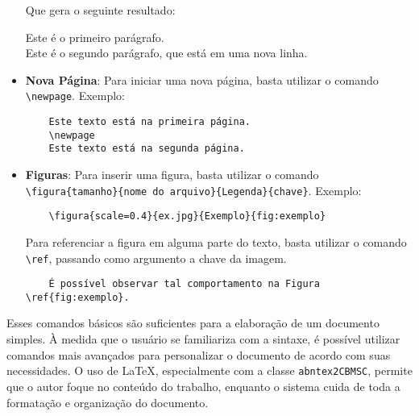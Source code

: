 \begin{itemize}
    Que gera o seguinte resultado:

    Este é o primeiro parágrafo.\\
    Este é o segundo parágrafo, que está em uma nova linha.
    
    \item \textbf{Nova Página}: Para iniciar uma nova página, basta utilizar o comando \texttt{\textbackslash newpage}. Exemplo:
    \begin{verbatim}
    Este texto está na primeira página.
    \newpage
    Este texto está na segunda página.
    \end{verbatim}

    \item \textbf{Figuras}: Para inserir uma figura, basta utilizar o comando \texttt{\textbackslash figura\{tamanho\}\{nome do arquivo\}\{Legenda\}\{chave\}}. Exemplo:
    \begin{verbatim}
    \figura{scale=0.4}{ex.jpg}{Exemplo}{fig:exemplo}
    \end{verbatim}

    Para referenciar a figura em alguma parte do texto, basta utilizar o comando \texttt{\textbackslash ref}, passando como argumento a chave da imagem.

    \begin{verbatim}
    É possível observar tal comportamento na Figura \ref{fig:exemplo}.
    \end{verbatim}
\end{itemize}

Esses comandos básicos são suficientes para a elaboração de um documento simples. À medida que o usuário se familiariza com a sintaxe, é possível utilizar comandos mais avançados para personalizar o documento de acordo com suas necessidades. O uso de LaTeX, especialmente com a classe \texttt{abntex2CBMSC}, permite que o autor foque no conteúdo do trabalho, enquanto o sistema cuida de toda a formatação e organização do documento.


